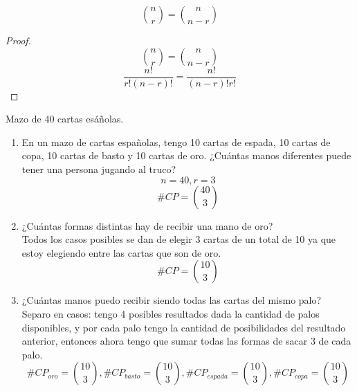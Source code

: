 \documentclass[../main.tex]{subfiles}
\begin{document}
\begin{observation}
    \begin{equation*}
        \binom{n}{r} = \binom{n}{n-r}
    \end{equation*}
\end{observation}

\begin{proof}
    \begin{equation*}
        \binom{n}{r} = \binom{n}{n-r}
    \end{equation*}
    \begin{equation*}
        \frac{n!}{r!(n-r)!} = \frac{n!}{(n-r)!r!}
    \end{equation*}
\end{proof}

\begin{defexample} Mazo de 40 cartas esáñolas.
    \begin{enumerate}[label=\alph*)]
        \item En un mazo de cartas españolas, tengo 10 cartas de espada, 10 cartas de copa, 10 cartas de basto y 10 cartas de oro. ¿Cuántas manos diferentes puede tener una persona jugando al truco?\\
            \begin{equation*}
                n = 40, r = 3
            \end{equation*}
            \begin{equation*}
                \#CP = \binom{40}{3}
            \end{equation*}
        \item ¿Cuántas formas distintas hay de recibir una mano de oro?\\
        Todos los casos posibles se dan de elegir 3 cartas de un total de 10 ya que estoy elegiendo entre las cartas que son de oro.
            \begin{equation*}
                \#CP = \binom{10}{3}
            \end{equation*}
        \item ¿Cuántas manos puedo recibir siendo todas las cartas del mismo palo?\\
        Separo en casos: tengo 4 posibles resultados dada la cantidad de palos disponibles, y por cada palo tengo la cantidad de posibilidades del resultado anterior, entonces ahora tengo que sumar todas las formas de sacar 3 de cada palo.
            \begin{equation*}
                \#CP_{oro} = \binom{10}{3}, \#CP_{basto} = \binom{10}{3}, \#CP_{espada} = \binom{10}{3}, \#CP_{copa} = \binom{10}{3}

\end{equation*}
\end{enumerate}
\end{defexample}
\end{document}
